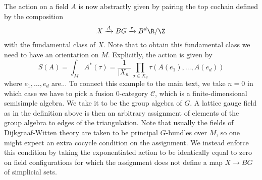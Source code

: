 \begin{example}
The action on a field $A$ is now abstractly given by pairing the top cochain defined by the composition
\[
X \xrightarrow{A} BG \xrightarrow{\tau} B^d \R / \Z
\]
with the fundamental class of $X$.
Note that to obtain this fundamental class we need to have an orientation on $M$.
Explicitly, the action is given by
\[
S(A) = \int_M A^*(\tau) = \frac{1}{|X_n|} \prod_{\sigma \in X_d} \tau(A(e_1), \dots, A(e_d))
\]
where $e_1, \dots, e_d$ are...
To connect this example to the main text, we take $n = 0$ in which case we have to pick a fusion $0$-category $\mathcal{C}$, which is a finite-dimensional semisimple algebra.
We take it to be the group algebra of $G$.
A lattice gauge field as in the definition above is then an arbitrary assignment of elements of the group algebra to edges of the triangulation.
Note that usually the fields of Dijkgraaf-Witten theory are taken to be principal $G$-bundles over $M$, so one might expect an extra cocycle condition on the assignment.
We instead enforce this condition by taking the exponentiated action to be identically equal to zero on field configurations for which the assignment does not define a map $X \to BG$ of simplicial sets.
\end{example}

\begin{example}
\end{example}